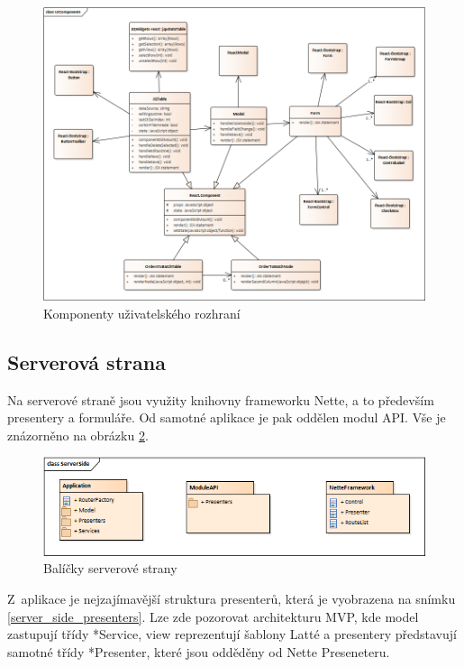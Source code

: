 \documentclass[thesis=B,czech]{FITthesis}[2012/06/26]
\begin{document}
\begin{figure}
	\includegraphics[width=\textwidth]{UI_components.png}
	\caption{Komponenty uživatelského rozhraní}\label{ui_komponents}
\end{figure}

\subsection{Serverová strana}
	Na serverové straně jsou využity knihovny frameworku Nette, a to především presentery a formuláře. Od samotné aplikace je pak oddělen modul API. Vše je znázorněno na obrázku \ref{server_side}.
	
\begin{figure}
	\includegraphics[width=\textwidth]{server_side.png}
	\caption{Balíčky serverové strany}\label{server_side}
\end{figure}

	Z~aplikace je nejzajímavější struktura presenterů, která je vyobrazena na snímku \ref{server_side_presenters}. Lze zde pozorovat architekturu MVP, kde model zastupují třídy *Service, view reprezentují šablony Latté a presentery představují samotné třídy *Presenter, které jsou odděděny od Nette Preseneteru.
\end{document}
